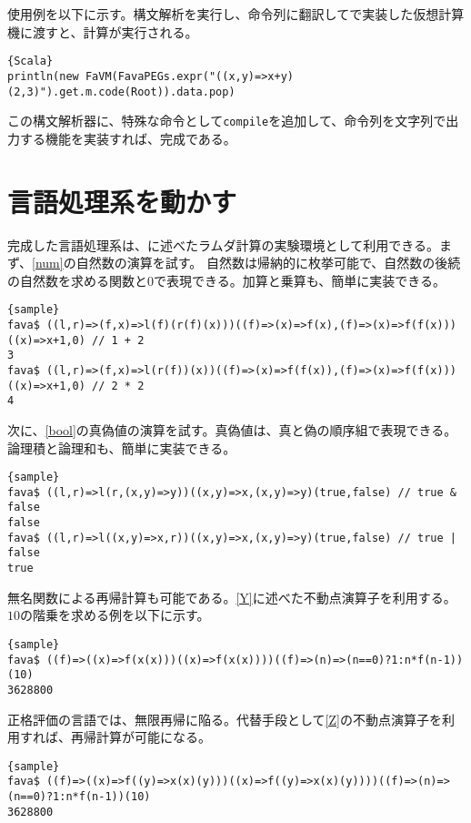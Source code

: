 \documentclass[10pt,a4paper]{book}
\begin{document}
使用例を以下に示す。構文解析を実行し、命令列に翻訳してで実装した仮想計算機に渡すと、計算が実行される。

\begin{Verbatim}{Scala}
println(new FaVM(FavaPEGs.expr("((x,y)=>x+y)(2,3)").get.m.code(Root)).data.pop)
\end{Verbatim}

この構文解析器に、特殊な命令として\texttt{compile}を追加して、命令列を文字列で出力する機能を実装すれば、完成である。

\section{言語処理系を動かす}

完成した言語処理系は、に述べたラムダ計算の実験環境として利用できる。まず、\eqref{num}の自然数の演算を試す。
自然数は帰納的に枚挙可能で、自然数の後続の自然数を求める関数と$0$で表現できる。加算と乗算も、簡単に実装できる。

\begin{Verbatim}{sample}
fava$ ((l,r)=>(f,x)=>l(f)(r(f)(x)))((f)=>(x)=>f(x),(f)=>(x)=>f(f(x)))((x)=>x+1,0) // 1 + 2
3
fava$ ((l,r)=>(f,x)=>l(r(f))(x))((f)=>(x)=>f(f(x)),(f)=>(x)=>f(f(x)))((x)=>x+1,0) // 2 * 2
4
\end{Verbatim}

次に、\eqref{bool}の真偽値の演算を試す。真偽値は、真と偽の順序組で表現できる。論理積と論理和も、簡単に実装できる。

\begin{Verbatim}{sample}
fava$ ((l,r)=>l(r,(x,y)=>y))((x,y)=>x,(x,y)=>y)(true,false) // true & false
false
fava$ ((l,r)=>l((x,y)=>x,r))((x,y)=>x,(x,y)=>y)(true,false) // true | false
true
\end{Verbatim}

無名関数による再帰計算も可能である。\eqref{Y}に述べた不動点演算子を利用する。$10$の階乗を求める例を以下に示す。

\begin{Verbatim}{sample}
fava$ ((f)=>((x)=>f(x(x)))((x)=>f(x(x))))((f)=>(n)=>(n==0)?1:n*f(n-1))(10)
3628800
\end{Verbatim}

正格評価の言語では、無限再帰に陥る。代替手段として\eqref{Z}の不動点演算子を利用すれば、再帰計算が可能になる。

\begin{Verbatim}{sample}
fava$ ((f)=>((x)=>f((y)=>x(x)(y)))((x)=>f((y)=>x(x)(y))))((f)=>(n)=>(n==0)?1:n*f(n-1))(10)
3628800
\end{Verbatim}
\end{document}
